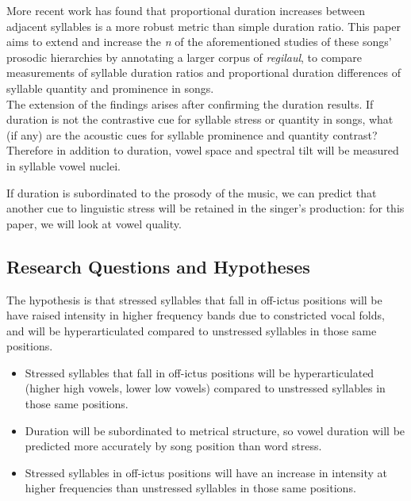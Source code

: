 \documentclass[11pt]{article}
\begin{document}
More recent work has found that proportional duration increases \cite{Lunden} between adjacent syllables is a more robust metric than simple duration ratio. This paper aims to extend and increase the {\it n} of the aforementioned studies of these songs' prosodic hierarchies by annotating a larger corpus of {\it regilaul}, to compare measurements of syllable duration ratios and proportional duration differences of syllable quantity and prominence in songs. \\

The extension of the findings arises after confirming the duration results. If duration is not the contrastive cue for syllable stress or quantity in songs, what (if any) are the acoustic cues for syllable prominence and quantity contrast? Therefore in addition to duration, vowel space and spectral tilt will be  measured in syllable vowel nuclei.


 If duration is subordinated to the prosody of the music, we can predict that another cue to linguistic stress will be retained in the singer’s production: for this paper, we will look at vowel quality. 

\subsection*{Research Questions and Hypotheses}

 The hypothesis is that stressed syllables that fall in off-ictus positions will be have raised intensity in higher frequency bands \cite{sluijterSpectralBalanceAcoustic1996} due to constricted vocal folds, and  will be hyperarticulated \cite{lindblomExplainingPhoneticVariation1990} compared to unstressed syllables in those same positions. 

% 

 \begin{itemize}
 \item Stressed syllables that fall in off-ictus positions will be hyperarticulated (higher high vowels, lower low vowels) compared to unstressed syllables in those same positions. 

 \item Duration will be subordinated to metrical structure, so vowel duration will be predicted more accurately by song position than word stress. 

 \item Stressed syllables in off-ictus positions will have an increase in intensity at higher frequencies than unstressed syllables in those same positions. 
 \end{itemize}
 
\end{document}
